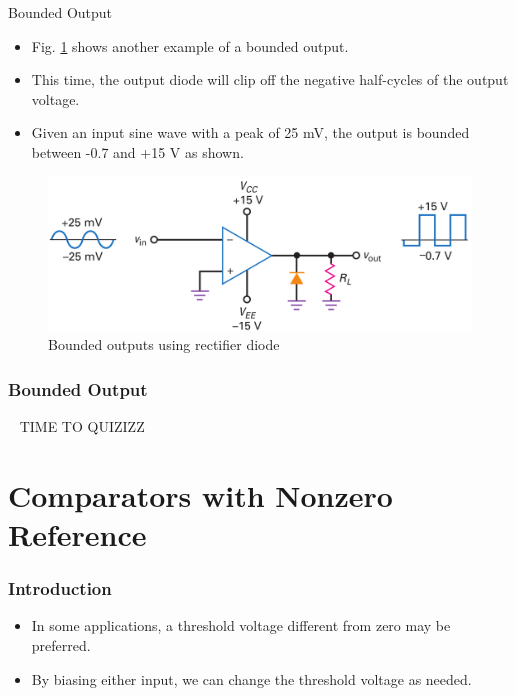 \documentclass[pdflatex,compress]{beamer}
\begin{document}
\begin{frame}{Bounded Output}
	\begin{itemize}
		\item Fig. \ref{fig:207b} shows another example of a bounded output.
		\item This time, the output diode will clip off the negative half-cycles of the output voltage.
		\item Given an input sine wave with a peak of 25 mV, the output is bounded between -0.7 and +15 V as shown.
	\end{itemize}
	\begin{figure}
		\centering
		\includegraphics[width=0.8\linewidth]{img/207b}
		\caption{Bounded outputs using rectiﬁer diode}
		\label{fig:207b}
	\end{figure}
\end{frame}

\begin{frame}
	\frametitle{Bounded Output}
	\centering
	~ TIME TO QUIZIZZ ~
\end{frame}

\section{Comparators with Nonzero Reference}

\begin{frame}
	\frametitle{Introduction}
	\begin{itemize}
		\item In some applications, a threshold voltage different from zero may be preferred.
		\item By biasing either input, we can change the threshold voltage as needed.
	\end{itemize}
\end{frame}
\end{document}
